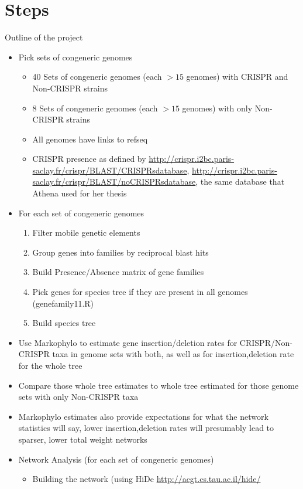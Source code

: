 \documentclass[12pt,letter]{article}
\begin{document}
\section*{Steps}
Outline of the project
\begin{itemize}
    \item Pick sets of congeneric genomes
    \begin{itemize}
        \item 40 Sets of congeneric genomes (each $>15$ genomes) with CRISPR and Non-CRISPR strains
        \item 8 Sets of congeneric genomes (each $>15$ genomes) with only Non-CRISPR strains
        \item All genomes have links to refseq
        \item CRISPR presence as defined by \url{http://crispr.i2bc.paris-saclay.fr/crispr/BLAST/CRISPRsdatabase}, \url{http://crispr.i2bc.paris-saclay.fr/crispr/BLAST/noCRISPRsdatabase}, the same database that Athena used for her thesis
    \end{itemize}
    \item For each set of congeneric genomes
    \begin{enumerate}
        \item Filter mobile genetic elements
        \item Group genes into families by reciprocal blast hits
        \item Build Presence/Absence matrix of gene families
        \item Pick genes for species tree if they are present in all genomes (genefamily11.R)
        \item Build species tree
    \end{enumerate}
    \item Use Markophylo to estimate gene insertion/deletion rates for CRISPR/Non-CRISPR taxa in genome sets with both, as well as for insertion,deletion rate for the whole tree
    \item Compare those whole tree estimates to whole tree estimated for those genome sets with only Non-CRISPR taxa
    \item Markophylo estimates also provide expectations for what the network statistics will say, lower insertion,deletion rates will presumably lead to sparser, lower total weight networks
    \item Network Analysis (for each set of congeneric genomes)
    \begin{itemize}
        \item Building the network (using HiDe \url{http://acgt.cs.tau.ac.il/hide/}

\end{itemize}
\end{itemize}
\end{document}
